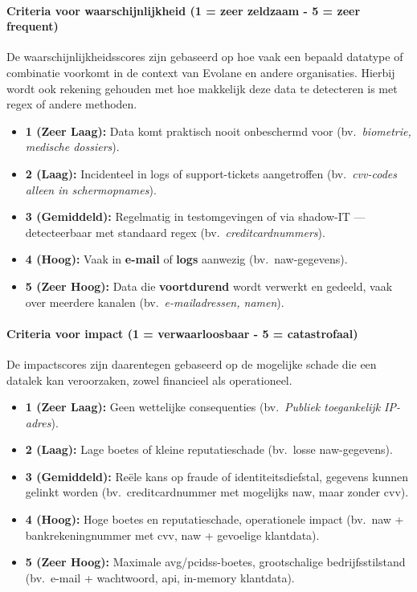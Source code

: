 \paragraph{Criteria voor waarschijnlijkheid (1 = zeer zeldzaam \-- 5 = zeer frequent)}

De waarschijnlijkheidsscores zijn gebaseerd op hoe vaak een bepaald datatype of combinatie voorkomt in de context van Evolane en andere organisaties. 
Hierbij wordt ook rekening gehouden met hoe makkelijk deze data te detecteren is met regex of andere methoden.

\begin{itemize}
  \item \textbf{1 (Zeer Laag):} Data komt praktisch nooit onbeschermd voor (bv.~\textit{biometrie, medische dossiers}).
  \item \textbf{2 (Laag):} Incidenteel in logs of support-tickets aangetroffen (bv.~\textit{\gls{cvv}-codes alleen in schermopnames}).
  \item \textbf{3 (Gemiddeld):} Regelmatig in testomgevingen of via shadow-IT — detecteerbaar met standaard regex (bv.~\textit{creditcardnummers}).
  \item \textbf{4 (Hoog):} Vaak in \textbf{e-mail} of \textbf{logs} aanwezig (bv.~\gls{naw}-gegevens).
  \item \textbf{5 (Zeer Hoog):} Data die \textbf{voortdurend} wordt verwerkt en gedeeld, vaak over meerdere kanalen (bv.~\textit{e-mailadressen, namen}).
\end{itemize}

\paragraph{Criteria voor impact (1 = verwaarloosbaar \-- 5 = catastrofaal)}

De impactscores zijn daarentegen gebaseerd op de mogelijke schade die een datalek kan veroorzaken, zowel financieel als operationeel.

\begin{itemize}
  \item \textbf{1 (Zeer Laag):} Geen wettelijke consequenties (bv.~\textit{Publiek toegankelijk IP-adres}).
  \item \textbf{2 (Laag):} Lage boetes of kleine reputatieschade (bv.~losse \gls{naw}-gegevens).
  \item \textbf{3 (Gemiddeld):} Reële kans op fraude of identiteitsdiefstal, gegevens kunnen gelinkt worden (bv.~creditcardnummer met mogelijks \gls{naw}, maar zonder \gls{cvv}).
  \item \textbf{4 (Hoog):} Hoge boetes en reputatieschade, operationele impact (bv.~\gls{naw} + bankrekeningnummer met \gls{cvv}, \gls{naw} + gevoelige klantdata).
  \item \textbf{5 (Zeer Hoog):} Maximale \gls{avg}/\gls{pcidss}-boetes, grootschalige bedrijfsstilstand (bv.~e-mail + wachtwoord, \gls{api}, in-memory klantdata).
\end{itemize}

